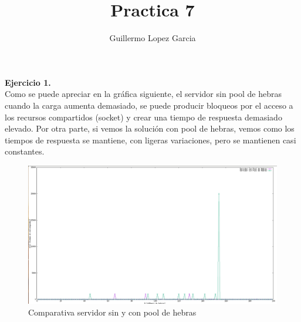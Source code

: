 \documentclass[]{article}
\title{Practica 7}
\author{Guillermo Lopez Garcia}
\begin{document}
\maketitle

\textbf{Ejercicio 1.} \\

Como se puede apreciar en la gráfica siguiente, el servidor sin pool de hebras cuando la carga aumenta demasiado,
se puede producir bloqueos por el acceso a los recursos compartidos (socket) y crear una tiempo de respuesta
demasiado elevado. Por otra parte, si vemos la solución con pool de hebras, vemos como los tiempos de respuesta
se mantiene, con ligeras variaciones, pero se mantienen casi constantes.

\begin{figure}
  \includegraphics[width=\linewidth]{img.png}
  \caption{Comparativa servidor sin y con pool de hebras}
\label{fig:comp}
\end{figure}
\end{document}
